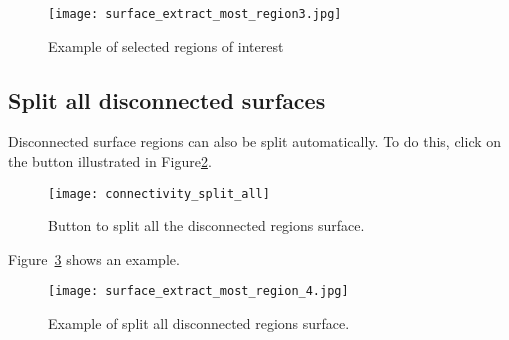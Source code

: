 \begin{figure}[!htb]
\centering
\texttt{[image: surface\_extract\_most\_region3.jpg]}
\caption{Example of selected regions of interest}
\label{fig:extract_most_region3}
\end{figure}


\subsection{Split all disconnected surfaces}

Disconnected surface regions can also be split automatically. To do this, click on the button illustrated in Figure\ref{fig:connectivity_split_all}.

\begin{figure}[!htb]
\centering
\texttt{[image: connectivity\_split\_all]}
\caption{Button to split all the disconnected regions surface.}
\label{fig:connectivity_split_all}
\end{figure}

Figure~\ref{fig:extrac_most_region_4} shows an example.

\begin{figure}[!htb]
\centering
\texttt{[image: surface\_extract\_most\_region\_4.jpg]}
\caption{Example of split all disconnected regions surface.}
\label{fig:extrac_most_region_4}
\end{figure}

